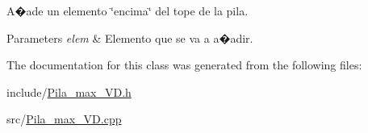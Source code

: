 A�ade un elemento \char`\"{}encima\char`\"{} del tope de la pila. 


\begin{DoxyParams}{Parameters}
{\em elem} & Elemento que se va a a�adir. \\
\hline
\end{DoxyParams}


The documentation for this class was generated from the following files\+:\begin{DoxyCompactItemize}
\item 
include/\mbox{\hyperlink{Pila__max__VD_8h}{Pila\+\_\+max\+\_\+\+V\+D.\+h}}\item 
src/\mbox{\hyperlink{Pila__max__VD_8cpp}{Pila\+\_\+max\+\_\+\+V\+D.\+cpp}}\end{DoxyCompactItemize}
